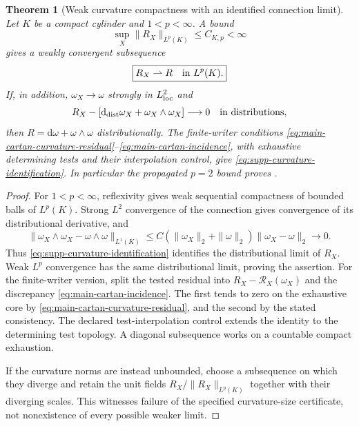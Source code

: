 \documentclass[11pt]{article}
\newtheorem{theorem}{Theorem}[section]
\theoremstyle{definition}
\theoremstyle{remark}
\newcommand{\dd}{\mathrm d}
\begin{document}
\begin{theorem}[Weak curvature compactness with an identified connection limit]
\label{thm:supp-curvature-compactness}
Let $K$ be a compact cylinder and $1<p<\infty$.  A bound
\begin{equation}
 \sup_X\|R_X\|_{L^p(K)}\le C_{K,p}<\infty
 \label{eq:supp-curvature-lp-bound}
\end{equation}
gives a weakly convergent subsequence
\begin{equation}
 \boxed{R_X\rightharpoonup R\quad\hbox{in }L^p(K).}
 \label{eq:supp-curvature-reflexive-limit}
\end{equation}
If, in addition, $\omega_X\to\omega$ strongly in $L^2_{\rm loc}$ and
\begin{equation}
 R_X-[\dd_{\rm dist}\omega_X+\omega_X\wedge\omega_X]
       \longrightarrow0\quad\hbox{in distributions},
 \label{eq:supp-curvature-identification}
\end{equation}
then $R=\dd\omega+\omega\wedge\omega$ distributionally.
The finite-writer conditions
\eqref{eq:main-cartan-curvature-residual}--\eqref{eq:main-cartan-incidence},
with exhaustive determining tests and their interpolation control, give
\eqref{eq:supp-curvature-identification}.  In particular the propagated
$p=2$ bound proves .
\end{theorem}
\begin{proof}
For $1<p<\infty$, reflexivity gives weak sequential compactness of bounded
balls of $L^p(K)$.  Strong $L^2$ convergence of the connection gives
convergence of its distributional derivative, and
\[
 \|\omega_X\wedge\omega_X-\omega\wedge\omega\|_{L^1(K)}
 \le C(\|\omega_X\|_2+\|\omega\|_2)\|\omega_X-\omega\|_2\to0.
\]
Thus \eqref{eq:supp-curvature-identification} identifies the distributional
limit of $R_X$.  Weak $L^p$ convergence has the same distributional limit,
proving the assertion.  For the finite-writer version, split the tested
residual into $R_X-\mathcal R_X(\omega_X)$ and the discrepancy
\eqref{eq:main-cartan-incidence}.  The first tends to zero on the exhaustive
core by \eqref{eq:main-cartan-curvature-residual}, and the second by the
stated consistency.  The declared test-interpolation control extends the
identity to the determining test topology.  A diagonal subsequence works on
a countable compact exhaustion.

If the curvature norms are instead unbounded, choose a subsequence on which
they diverge and retain the unit fields $R_X/\|R_X\|_{L^p(K)}$ together
with their diverging scales.  This witnesses failure of the specified
curvature-size certificate, not nonexistence of every possible weaker limit.
\end{proof}
\end{document}
